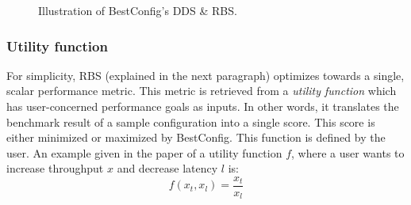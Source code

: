\begin{figure}
\centering
{}

\caption{Illustration of BestConfig's DDS \&  RBS.}
\end{figure}


\subsubsection{Utility function}
For simplicity, RBS (explained in the next paragraph) optimizes towards a single, scalar performance metric. This metric is retrieved from a \textit{utility function} which has user-concerned performance goals as inputs. In other words, it translates the  benchmark result of a sample configuration into a single score. This score is either minimized or maximized by BestConfig. This function is defined by the user.  An example given in the paper of a utility function $f$, where a user wants to increase throughput $x$ and decrease latency $l$ is:
\begin{equation}
    f(x_{t},x_{l}) = \frac{x_{t}}{x_{l}}
\end{equation}

